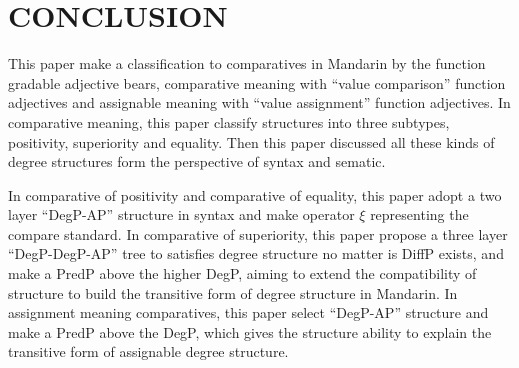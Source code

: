 \documentclass{ctexart}
\begin{document}
\section{CONCLUSION}

This paper make a classification to comparatives in Mandarin by the function gradable adjective bears, comparative meaning with ``value comparison'' function adjectives and assignable meaning with ``value assignment'' function adjectives. In comparative meaning, this paper 
classify structures into three subtypes, positivity, superiority and equality. Then this paper discussed all these kinds of degree structures form the perspective of syntax and sematic. 

In comparative of positivity and comparative of equality, this paper adopt a two layer ``DegP-AP'' structure in syntax and make operator $\xi$ representing the compare standard. In comparative of superiority, this paper propose a three layer ``DegP-DegP-AP'' tree to satisfies degree structure no matter is DiffP exists, and make a PredP above the higher DegP, aiming to extend the compatibility of structure to build the transitive form of degree structure in Mandarin. In assignment meaning comparatives, this paper select ``DegP-AP'' structure and make a PredP above the DegP, which gives the structure ability to explain the transitive form of assignable degree structure.

\newpage

\printbibliography
\end{document}
